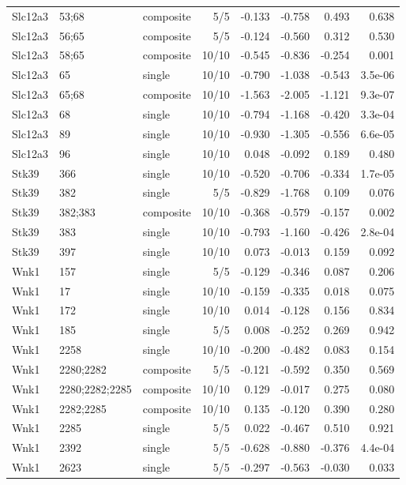 \documentclass[10pt]{article}
\begin{document}
\begin{longtable}{lllrrrrr}
Slc12a3 & 53;68 & composite & 5/5 & -0.133 & -0.758 & 0.493 & 0.638 \\
Slc12a3 & 56;65 & composite & 5/5 & -0.124 & -0.560 & 0.312 & 0.530 \\
Slc12a3 & 58;65 & composite & 10/10 & -0.545 & -0.836 & -0.254 & 0.001 \\
Slc12a3 & 65 & single & 10/10 & -0.790 & -1.038 & -0.543 & 3.5e-06 \\
Slc12a3 & 65;68 & composite & 10/10 & -1.563 & -2.005 & -1.121 & 9.3e-07 \\
Slc12a3 & 68 & single & 10/10 & -0.794 & -1.168 & -0.420 & 3.3e-04 \\
Slc12a3 & 89 & single & 10/10 & -0.930 & -1.305 & -0.556 & 6.6e-05 \\
Slc12a3 & 96 & single & 10/10 & 0.048 & -0.092 & 0.189 & 0.480 \\
Stk39 & 366 & single & 10/10 & -0.520 & -0.706 & -0.334 & 1.7e-05 \\
Stk39 & 382 & single & 5/5 & -0.829 & -1.768 & 0.109 & 0.076 \\
Stk39 & 382;383 & composite & 10/10 & -0.368 & -0.579 & -0.157 & 0.002 \\
Stk39 & 383 & single & 10/10 & -0.793 & -1.160 & -0.426 & 2.8e-04 \\
Stk39 & 397 & single & 10/10 & 0.073 & -0.013 & 0.159 & 0.092 \\
Wnk1 & 157 & single & 5/5 & -0.129 & -0.346 & 0.087 & 0.206 \\
Wnk1 & 17 & single & 10/10 & -0.159 & -0.335 & 0.018 & 0.075 \\
Wnk1 & 172 & single & 10/10 & 0.014 & -0.128 & 0.156 & 0.834 \\
Wnk1 & 185 & single & 5/5 & 0.008 & -0.252 & 0.269 & 0.942 \\
Wnk1 & 2258 & single & 10/10 & -0.200 & -0.482 & 0.083 & 0.154 \\
Wnk1 & 2280;2282 & composite & 5/5 & -0.121 & -0.592 & 0.350 & 0.569 \\
Wnk1 & 2280;2282;2285 & composite & 10/10 & 0.129 & -0.017 & 0.275 & 0.080 \\
Wnk1 & 2282;2285 & composite & 10/10 & 0.135 & -0.120 & 0.390 & 0.280 \\
Wnk1 & 2285 & single & 5/5 & 0.022 & -0.467 & 0.510 & 0.921 \\
Wnk1 & 2392 & single & 5/5 & -0.628 & -0.880 & -0.376 & 4.4e-04 \\
Wnk1 & 2623 & single & 5/5 & -0.297 & -0.563 & -0.030 & 0.033 \\

\end{longtable}
\end{document}
